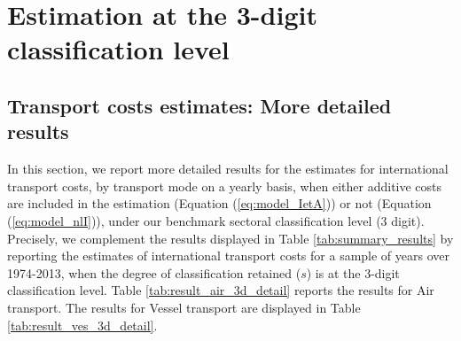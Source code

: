 \documentclass[a4paper,11pt]{article}
\begin{document}
\clearpage
\setcounter{table}{0}
\setcounter{figure}{0}
\renewcommand{\thefigure}{B.\arabic{figure}}
\renewcommand{\thetable}{B.\arabic{table}}

\section{Estimation at the 3-digit classification level \label{app:more_results}}

\subsection{Transport costs estimates: More detailed results}

In this section, we report more detailed results for the estimates for international transport costs, by transport mode on a yearly basis, when either additive costs are included in the estimation (Equation (\ref{eq:model_IetA})) or not (Equation (\ref{eq:model_nlI})), under our benchmark sectoral classification level (3 digit).
Precisely, we complement the results displayed in Table \ref{tab:summary_results} by reporting the estimates of international transport costs for a sample of years over 1974-2013, when the degree of classification retained ($s$) is at the 3-digit classification level.
Table \ref{tab:result_air_3d_detail} reports the results for Air transport.
The results for Vessel transport are displayed in Table \ref{tab:result_ves_3d_detail}.
\end{document}
